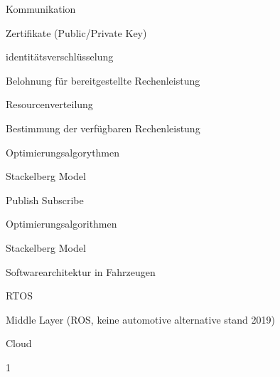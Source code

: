\begin{notes}

    \item Kommunikation
    \begin{notes}
        \item Zertifikate (Public/Private Key)
        \item identitätsverschlüsselung
        \item Belohnung für bereitgestellte Rechenleistung
    \end{notes}
    \item Resourcenverteilung
    \begin{notes}
        \item Bestimmung der verfügbaren Rechenleistung 
        \item Optimierungsalgorythmen
        \item Stackelberg Model
    \end{notes}
    \item Publish Subscribe
    \begin{notes}
        \item 
        \item Optimierungsalgorithmen
        \item Stackelberg Model
    \end{notes}
    \item Softwarearchitektur in Fahrzeugen
   \begin{notes}
        \item RTOS
        \item Middle Layer (ROS, keine automotive alternative stand 2019)
        \item Cloud
    \end{notes}
\end{notes}

\begin{notes}
     \item 1
\end{notes}


